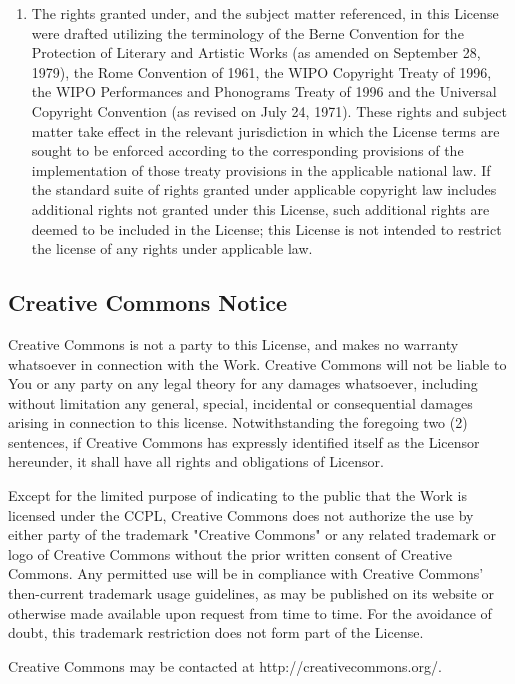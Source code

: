 \documentclass{article}
\begin{document}
{\begin{enumerate}
\begin{enumerate}
		\item The rights granted under, and the subject matter referenced, in this License were drafted utilizing the terminology of the Berne Convention for the Protection of Literary and Artistic Works (as amended on September 28, 1979), the Rome Convention of 1961, the WIPO Copyright Treaty of 1996, the WIPO Performances and Phonograms Treaty of 1996 and the Universal Copyright Convention (as revised on July 24, 1971). These rights and subject matter take effect in the relevant jurisdiction in which the License terms are sought to be enforced according to the corresponding provisions of the implementation of those treaty provisions in the applicable national law. If the standard suite of rights granted under applicable copyright law includes additional rights not granted under this License, such additional rights are deemed to be included in the License; this License is not intended to restrict the license of any rights under applicable law.
	\end{enumerate}
\end{enumerate}
\subsection{Creative Commons Notice}
Creative Commons is not a party to this License, and makes no warranty whatsoever in connection with the Work. Creative Commons will not be liable to You or any party on any legal theory for any damages whatsoever, including without limitation any general, special, incidental or consequential damages arising in connection to this license. Notwithstanding the foregoing two (2) sentences, if Creative Commons has expressly identified itself as the Licensor hereunder, it shall have all rights and obligations of Licensor.

Except for the limited purpose of indicating to the public that the Work is licensed under the CCPL, Creative Commons does not authorize the use by either party of the trademark "Creative Commons" or any related trademark or logo of Creative Commons without the prior written consent of Creative Commons. Any permitted use will be in compliance with Creative Commons' then-current trademark usage guidelines, as may be published on its website or otherwise made available upon request from time to time. For the avoidance of doubt, this trademark restriction does not form part of the License.

Creative Commons may be contacted at http://creativecommons.org/.}
\end{document}
